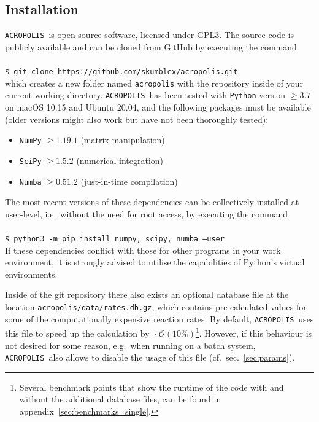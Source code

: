 \documentclass[11pt,a4paper]{article}
\newcommand{\cmd}[1]{\vspace{0.3cm}\texttt{\$ #1}\\[0.3cm]}
\newcommand{\acropolis}{\texttt{ACROPOLIS}~}
\begin{document}
\subsection{Installation}
\acropolis is open-source software, licensed under GPL3. The source code is publicly available and can be cloned from GitHub by executing the command\\\\
\cmd{git clone https://github.com/skumblex/acropolis.git}
which creates a new folder named \texttt{acropolis} with the repository inside of your current working directory.
\acropolis has been tested with \texttt{Python} version $\geq 3.7$ on macOS 10.15 and Ubuntu 20.04, and the following packages must be available (older versions might also work but have not been thoroughly tested):
\begin{itemize}
	\item \href{https://numpy.org/}{\texttt{NumPy}} $\geq 1.19.1$ (matrix manipulation)
	\item \href{https://www.scipy.org/}{\texttt{SciPy}} $\geq 1.5.2$ (numerical integration)
	\item \href{https://numba.pydata.org/}{\texttt{Numba}} $\geq 0.51.2$ (just-in-time compilation)
\end{itemize}
The most recent versions of these dependencies can be collectively installed at user-level, i.e.\ without the need for root access, by executing the command\\\\
\cmd{python3 -m pip install numpy, scipy, numba --user}
If these dependencies conflict with those for other programs in your work environment, it is strongly advised to utilise the capabilities of Python's virtual environments.

Inside of the git repository there also exists an optional database file at the location \texttt{acropolis/data/rates.db.gz}, which contains pre-calculated values for some of the computationally expensive reaction rates. By default, \acropolis uses this file to speed up the calculation by $\sim \mathcal{O}(10\%)$\footnote{Several benchmark points that show the runtime of the code with and without the additional database files, can be found in appendix~\ref{sec:benchmarks_single}.}. However, if this behaviour is not desired for some reason, e.g.\ when running on a batch system, \acropolis also allows to disable the usage of this file (cf.~sec.~\ref{sec:params}).
\end{document}

